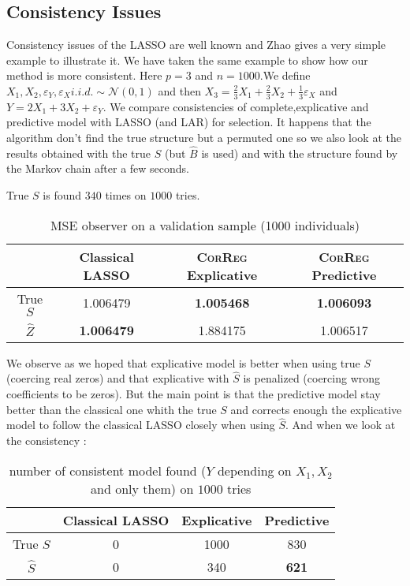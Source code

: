 \documentclass[11pt,a4paper]{report}
\begin{document}
		\subsection{Consistency Issues}\label{consistency}
		Consistency issues of the LASSO are well known and Zhao \cite{Zhao2006MSC} gives a very simple example to illustrate it.
		We have taken the same example to show how our method is more consistent.
		Here $p=3$ and $n=1000$.We define $X_1,X_2,\varepsilon_Y,\varepsilon_{X} i.i.d. \sim \mathcal{N}(0,1)$ and then $X_3=\frac{2}{3}X_1+\frac{2}{3}X_2+\frac{1}{3}\varepsilon_X$ and $Y=2X_1+3X_2+\varepsilon_Y$.
		We compare consistencies of complete,explicative and predictive model with LASSO (and LAR) for selection.
		It happens that the algorithm don't find the true structure but a permuted one so we also look at the results obtained with the true $S$ (but $\hat{B}$ is used) and with the structure found by the Markov chain after a few seconds.
		
		True $S$ is found $340$ times on $1000$ tries.
		
		\begin{table}[h!]
		\centering
		\begin{tabular}{|c|c|c|c|}
		\hline 
		 & Classical LASSO & \textsc{CorReg} Explicative & \textsc{CorReg} Predictive \\ 
		\hline 
		True $S$ &  1.006479 & \textbf{1.005468} & \textbf{1.006093} \\ 
		\hline 
		$\hat{Z}$ & \textbf{1.006479} & 1.884175 & 1.006517 \\ 
		\hline 
		\end{tabular} 
		\caption{MSE observer on a validation sample (1000 individuals)}
		\end{table}

		We observe as we hoped that explicative model is better when using true $S$ (coercing real zeros) and that explicative with $\hat{S}$ is penalized (coercing wrong coefficients to be zeros).
		But the main point is that the predictive model stay better than the classical one whith the true $S$ and corrects enough the explicative model to follow the classical LASSO closely when using $\hat{S}$. 
		And when we look at the consistency :
		\begin{table}[h!]	
		\centering
		\begin{tabular}{|c|c|c|c|}
		\hline 
		 & Classical LASSO & Explicative & Predictive \\ 
		\hline 
		True $S$ &  0 & 1000 & 830 \\ 
		\hline 
		$\hat{S}$ & 0 & 340 & \textbf{621} \\ 
		\hline 
		\end{tabular} 
		\caption{number of consistent model found ($Y$ depending on $X_1,X_2$ and only them) on $1000$ tries}
		\end{table}				
		
\end{document}
